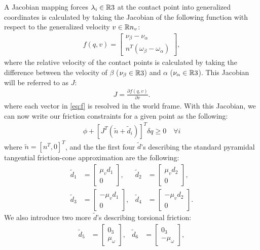A Jacobian mapping forces $\lambda_i \in \mathbb{R}{3}$ at the contact point into generalized coordinates is calculated by taking the Jacobian of the following function with respect to the generalized velocity $v \in \mathbb{R}{n_v}$:
\begin{align}
    f(q,v) = \begin{bmatrix} \nu_\beta - \nu_\alpha \\ n^T(\omega_\beta -  \omega_\alpha) \end{bmatrix}, \label{eq:f}
\end{align}
where the relative velocity of the contact points is calculated by taking the difference between the velocity of $\beta$ ($\nu_\beta \in \mathbb{R}{3}$) and $\alpha$ ($\nu_\alpha \in \mathbb{R}{3}$). This Jacobian will be referred to as $J$:
\begin{align}
    J = \frac{\partial f(q,v)}{\partial v}.
\end{align}
where each vector in \eqref{eq:f} is resolved in the world frame. With this Jacobian, we can now write our friction constraints for a given point as the following:
\begin{align}
    \phi + [J^T(\tilde{n} + \tilde{d}_i)]^T  \delta q \geq 0 \quad \forall i
\end{align}
where $\tilde{n} = [n^T,0]^T$, and the the first four $\tilde{d}$'s describing the standard pyramidal tangential friction-cone approximation are the following:
\begin{align}
    \tilde{d}_1 &= \begin{bmatrix} \mu_v d_1 \\ 0 \end{bmatrix}, & \tilde{d}_2 &= \begin{bmatrix} \mu_v d_2 \\ 0 \end{bmatrix}, \\ \tilde{d}_3 &= \begin{bmatrix} -\mu_v d_1 \\ 0 \end{bmatrix},  & \tilde{d}_4 &= \begin{bmatrix} -\mu_v d_2 \\ 0 \end{bmatrix} .
\end{align}
We also introduce two more $\tilde{d}$'s describing torsional friction:
\begin{align}
    \tilde{d}_5 &= \begin{bmatrix} 0_3 \\ \mu_\omega \end{bmatrix}, & \tilde{d}_6 &= \begin{bmatrix} 0_3 \\ -\mu_\omega \end{bmatrix} ,
\end{align}
